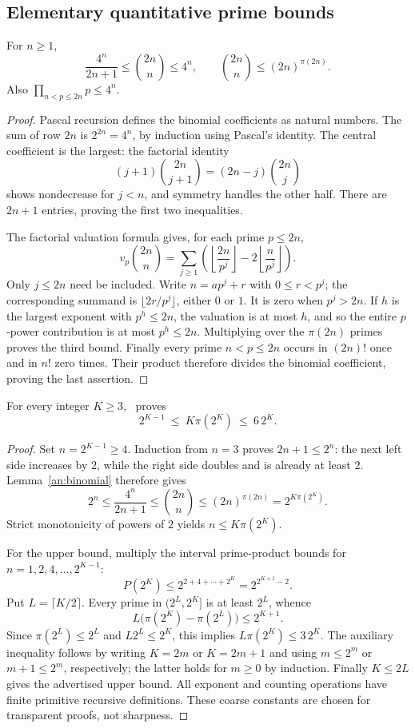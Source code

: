 \subsection{Elementary quantitative prime bounds}
\begin{lemma}\label{an:binomial}
For $n\ge1$,
\[
 \frac{4^n}{2n+1}\le \binom{2n}{n}\le4^n,
 \qquad \binom{2n}{n}\le(2n)^{\pi(2n)}.
\]
Also $\prod_{n<p\le2n}p\le4^n$.
\end{lemma}
\begin{proof}
Pascal recursion defines the binomial coefficients as natural numbers. The sum of row $2n$ is $2^{2n}=4^n$, by induction using Pascal's identity. The central coefficient is the largest: the factorial identity
\[
 (j+1)\binom{2n}{j+1}=(2n-j)\binom{2n}{j}
\]
shows nondecrease for $j<n$, and symmetry handles the other half. There are $2n+1$ entries, proving the first two inequalities.

The factorial valuation formula gives, for each prime $p\le2n$,
\[
 v_p\binom{2n}{n}
 =\sum_{j\ge1}\left(\left\lfloor\frac{2n}{p^j}\right\rfloor
       -2\left\lfloor\frac n{p^j}\right\rfloor\right).
\]
Only $j\le2n$ need be included. Write $n=ap^j+r$ with $0\le r<p^j$; the corresponding summand is $\lfloor2r/p^j\rfloor$, either $0$ or $1$. It is zero when $p^j>2n$. If $h$ is the largest exponent with $p^h\le2n$, the valuation is at most $h$, and so the entire $p$-power contribution is at most $p^h\le2n$. Multiplying over the $\pi(2n)$ primes proves the third bound. Finally every prime $n<p\le2n$ occurs in $(2n)!$ once and in $n!$ zero times. Their product therefore divides the binomial coefficient, proving the last assertion.
\end{proof}

\begin{theorem}\label{an:chebyshev}
For every integer $K\ge3$, \ipra\ proves
\[
 2^{K-1}\ \le\ K\pi(2^K)\ \le\ 6\,2^K.
\]
\end{theorem}
\begin{proof}
Set $n=2^{K-1}\ge4$. Induction from $n=3$ proves $2n+1\le2^n$: the next left side increases by $2$, while the right side doubles and is already at least $2$. Lemma~\ref{an:binomial} therefore gives
\[
 2^n\le\frac{4^n}{2n+1}\le \binom{2n}{n}
 \le (2n)^{\pi(2n)}=2^{K\pi(2^K)}.
\]
Strict monotonicity of powers of $2$ yields $n\le K\pi(2^K)$.

For the upper bound, multiply the interval prime-product bounds for $n=1,2,4,\ldots,2^{K-1}$:
\[
 P(2^K)\le 2^{2+4+\cdots+2^K}=2^{2^{K+1}-2}.
\]
Put $L=\lceil K/2\rceil$. Every prime in $(2^L,2^K]$ is at least $2^L$, whence
\[
 L\bigl(\pi(2^K)-\pi(2^L)\bigr)\le2^{K+1}.
\]
Since $\pi(2^L)\le2^L$ and $L2^L\le2^K$, this implies $L\pi(2^K)\le3\,2^K$. The auxiliary inequality follows by writing $K=2m$ or $K=2m+1$ and using $m\le2^m$ or $m+1\le2^m$, respectively; the latter holds for $m\ge0$ by induction. Finally $K\le2L$ gives the advertised upper bound. All exponent and counting operations have finite primitive recursive definitions. These coarse constants are chosen for transparent proofs, not sharpness.
\end{proof}

